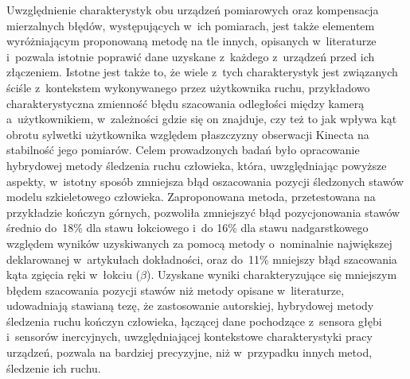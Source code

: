 Uwzględnienie charakterystyk obu urządzeń pomiarowych oraz kompensacja mierzalnych błędów, występujących w~ich pomiarach, jest także elementem wyróżniającym proponowaną metodę na tle innych, opisanych w~literaturze i~pozwala istotnie poprawić dane uzyskane z~każdego z~urządzeń przed ich złączeniem. Istotne jest także to, że wiele z~tych charakterystyk jest związanych ściśle z~kontekstem wykonywanego przez użytkownika ruchu, przykładowo charakterystyczna zmienność błędu szacowania odległości między kamerą a~użytkownikiem, w~zależności gdzie się on znajduje, czy też to jak wpływa kąt obrotu sylwetki użytkownika względem płaszczyzny obserwacji Kinecta na stabilność jego pomiarów. Celem prowadzonych badań było opracowanie hybrydowej metody śledzenia ruchu człowieka, która, uwzględniając powyższe aspekty, w~istotny sposób zmniejsza błąd oszacowania pozycji śledzonych stawów modelu szkieletowego człowieka. Zaproponowana metoda, przetestowana na przykładzie kończyn górnych, pozwoliła zmniejszyć błąd pozycjonowania stawów średnio do~18\% dla stawu łokciowego i~do 16\% dla stawu nadgarstkowego względem wyników uzyskiwanych za pomocą metody o~nominalnie największej deklarowanej w~artykułach dokładności, oraz do~11\% mniejszy błąd szacowania kąta zgięcia ręki w~łokciu ($\beta$). Uzyskane wyniki charakteryzujące się mniejszym błędem szacowania pozycji stawów niż metody opisane w~literaturze, udowadniają stawianą tezę, że zastosowanie autorskiej, hybrydowej metody śledzenia ruchu kończyn człowieka, łączącej dane pochodzące z~sensora głębi i~sensorów inercyjnych, uwzględniającej kontekstowe charakterystyki pracy urządzeń, pozwala na bardziej precyzyjne, niż w~przypadku innych metod, śledzenie ich ruchu.

